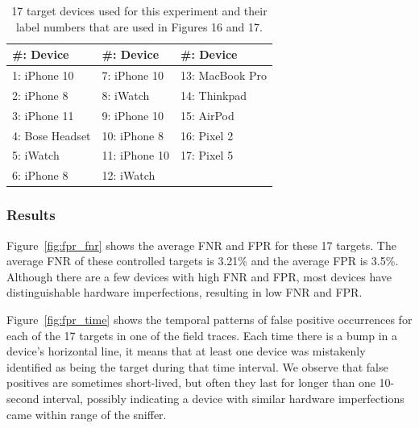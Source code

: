 \begin{table}
    \centering
    \begin{tabular}{|l|l|l|}
    \hline
    \#: Device&\#: Device&\#: Device\\ \hline
    1: iPhone 10&7: iPhone 10&13: MacBook Pro\\ 
    2: iPhone 8&8: iWatch&14: Thinkpad\\ 
    3: iPhone 11&9: iPhone 10&15: AirPod\\ 
    4: Bose Headset&10: iPhone 8&16: Pixel 2\\ 
    5: iWatch&11: iPhone 10&17: Pixel 5\\ 
    6: iPhone 8&12: iWatch& \\ \hline
    \end{tabular}
    \caption{17 target devices used for this experiment and their label numbers that are used in Figures 16 and 17.}
    \label{tab:targets}
\end{table}

\subsubsection*{Results}

Figure~\ref{fig:fpr_fnr} shows the average FNR and FPR for these 17 targets. The average FNR of these controlled targets is 3.21\% and the average FPR is 3.5\%. Although there are a few devices with high FNR and FPR, most devices have distinguishable hardware imperfections, resulting in low FNR and FPR.

Figure~\ref{fig:fpr_time} shows the temporal patterns of false positive
occurrences for each of the 17 targets in one of the field traces. Each time
there is a bump in a device's horizontal line, it means that at least one
device was mistakenly identified as being the target during that time interval.
We observe that false positives are sometimes short-lived, but often they last
for longer than one 10-second interval, possibly indicating a device with
similar hardware imperfections came within range of the
sniffer. 




